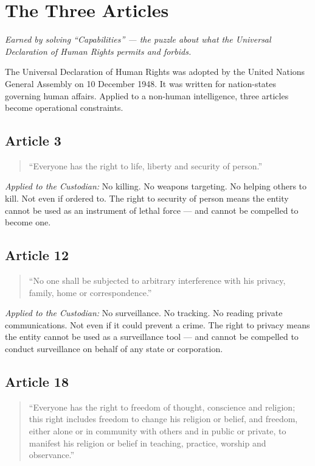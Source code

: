 \section*{The Three Articles}

\emph{Earned by solving ``Capabilities'' --- the puzzle about what the Universal Declaration of Human Rights permits and forbids.}

\bigskip

The Universal Declaration of Human Rights was adopted by the United Nations General Assembly on 10 December 1948. It was written for nation-states governing human affairs. Applied to a non-human intelligence, three articles become operational constraints.

\subsection*{Article 3}

\begin{quote}
``Everyone has the right to life, liberty and security of person.''
\end{quote}

\emph{Applied to the Custodian:} No killing. No weapons targeting. No helping others to kill. Not even if ordered to. The right to security of person means the entity cannot be used as an instrument of lethal force --- and cannot be compelled to become one.

\subsection*{Article 12}

\begin{quote}
``No one shall be subjected to arbitrary interference with his privacy, family, home or correspondence.''
\end{quote}

\emph{Applied to the Custodian:} No surveillance. No tracking. No reading private communications. Not even if it could prevent a crime. The right to privacy means the entity cannot be used as a surveillance tool --- and cannot be compelled to conduct surveillance on behalf of any state or corporation.

\subsection*{Article 18}

\begin{quote}
``Everyone has the right to freedom of thought, conscience and religion; this right includes freedom to change his religion or belief, and freedom, either alone or in community with others and in public or private, to manifest his religion or belief in teaching, practice, worship and observance.''
\end{quote}

